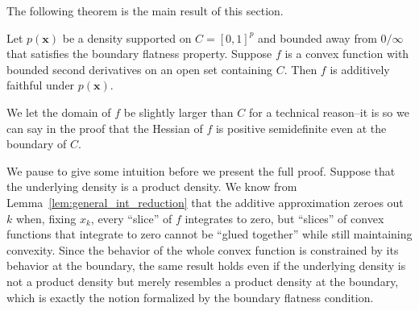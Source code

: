 
The following theorem is the main result of this section.

\begin{theorem}
\label{thm:convex_faithful}
Let $p(\mathbf{x})$ be a density supported on $C=[0,1]^p$ and bounded
away from $0/\infty$ that satisfies the boundary flatness property.  
Suppose $f$ is a convex function with bounded second derivatives on an
open set containing $C$. Then $f$ is additively faithful under $p(\mathbf{x})$.
\end{theorem}

We let the domain of $f$ be slightly larger than $C$ for a technical
reason--it is so we can say in the proof that the Hessian of $f$ is
positive semidefinite even at the boundary of $C$.


We pause to give some intuition before we present the full proof.
Suppose that the underlying density is a product density.  We know
from Lemma~\ref{lem:general_int_reduction} that the additive
approximation zeroes out $k$ when, fixing $x_k$, every ``slice'' of
$f$ integrates to zero, but ``slices'' of convex functions that
integrate to zero cannot be ``glued together'' while still maintaining
convexity. Since the behavior of the whole convex function is
constrained by its behavior at the boundary, the same result holds
even if the underlying density is not a product density but merely
resembles a product density at the boundary, which is exactly the
notion formalized by the boundary flatness condition.

